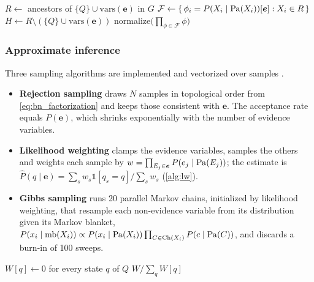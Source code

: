 \begin{algorithm}[H]
  \caption{Variable elimination for $P(Q \mid \bm{e})$}
  \label{alg:ve}
  $R \leftarrow$ ancestors of $\{Q\} \cup \mathrm{vars}(\bm{e})$ in $G$ 
  $\mathcal{F} \leftarrow \{\, \phi_i = P(X_i \mid \operatorname{Pa}(X_i))[\bm{e}] : X_i \in R \,\}$ 
  $H \leftarrow R \setminus (\{Q\} \cup \mathrm{vars}(\bm{e}))$\;
  \Return normalize$\big(\prod_{\phi \in \mathcal{F}} \phi\big)$\;
\end{algorithm}

\subsubsection{Approximate inference}
Three sampling algorithms are implemented and vectorized over samples \cite{aima,koller2009}.
\begin{itemize}[nosep]
  \item \textbf{Rejection sampling} draws $N$ samples in topological order from \cref{eq:bn_factorization} and keeps those consistent with $\bm{e}$. The acceptance rate equals $P(\bm{e})$, which shrinks exponentially with the number of evidence variables.
  \item \textbf{Likelihood weighting} \cite{fungchang1990} clamps the evidence variables, samples the others and weights each sample by $w = \prod_{E_j \in \bm{e}} P(e_j \mid \operatorname{Pa}(E_j))$; the estimate is $\hat{P}(q \mid \bm{e}) = \sum_s w_s \mathbb{1}[q_s = q] / \sum_s w_s$ (\cref{alg:lw}).
  \item \textbf{Gibbs sampling} \cite{geman1984} runs 20 parallel Markov chains, initialized by likelihood weighting, that resample each non-evidence variable from its distribution given its Markov blanket,
  $P(x_i \mid \mathrm{mb}(X_i)) \propto P(x_i \mid \operatorname{Pa}(X_i)) \prod_{C \in \mathrm{Ch}(X_i)} P(c \mid \operatorname{Pa}(C))$,
  and discards a burn-in of 100 sweeps.
\end{itemize}

\begin{algorithm}[H]
  \caption{Likelihood weighting for $P(Q \mid \bm{e})$}
  \label{alg:lw}
  $W[q] \leftarrow 0$ for every state $q$ of $Q$\;
  \Return $W / \sum_q W[q]$\;
\end{algorithm}

